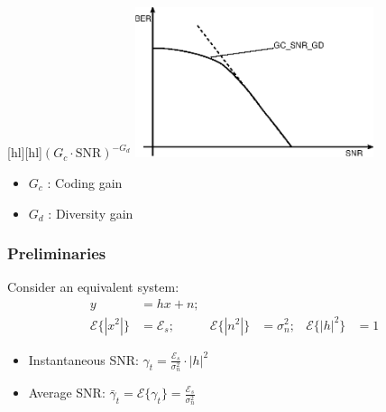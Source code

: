 \documentclass[a4paper, 10pt]{article}
\begin{document}
\begin{minipage}[hbt]{7cm}
	\centering
	[hl][hl]{$(G_c\cdot\text{SNR})^{-G_d}$}
	\includegraphics[width=7cm]{SIMO_BER_SNR_Kurve}
\end{minipage}
\hfill
\begin{minipage}[hbt]{5cm}
	\centering
		\begin{itemize}
			\item $G_c$ : Coding gain
			\item $G_d$ : Diversity gain
		\end{itemize}
\end{minipage}

\subsubsection{Preliminaries}
Consider an equivalent system:
\begin{align*}
	y &= hx +n;\\
	\mathcal{E}\{|x^2|\} &= \mathcal{E}_s; & \mathcal{E}\{|n^2|\} &= \sigma_n^2; & \mathcal{E}\{|h|^2\} &= 1
\end{align*}
\begin{itemize}
	\item Instantaneous SNR: $\gamma_t = \frac{\mathcal{E}_s}{\sigma_n^2}\cdot |h|^2$
\item Average SNR: $\bar{\gamma}_t = \mathcal{E}\{\gamma_t\} = \frac{\mathcal{E}_s}{\sigma_n^2}$
\end{itemize}
\end{document}

